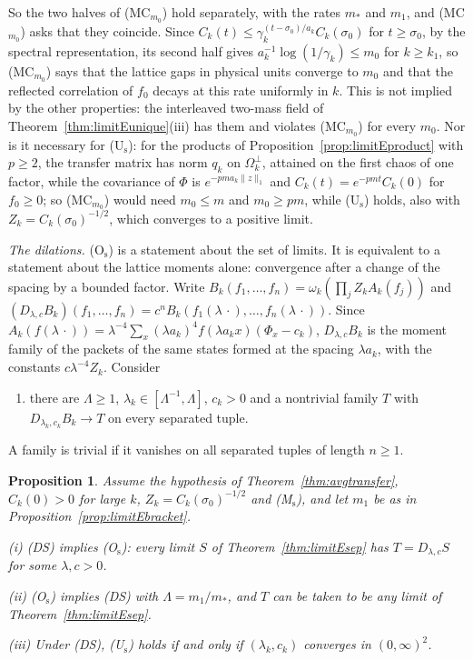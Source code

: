\documentclass[aps,prd,twocolumn,superscriptaddress,nofootinbib,longbibliography,floatfix,amsmath,amssymb,10pt]{revtex4-2}
\newtheorem{proposition}[theorem]{Proposition}
\theoremstyle{definition}
\theoremstyle{remark}
\begin{document}
So the two halves of (MC$_{m_0}$) hold separately, with the rates $m_*$
and $m_1$, and (MC$_{m_0}$) asks that they coincide. Since $C_k(t)\le
\gamma_k^{(t-\sigma_0)/a_k}C_k(\sigma_0)$ for $t\ge\sigma_0$, by the spectral
representation, its second half gives $a_k^{-1}\log(1/\gamma_k)\le m_0$ for
$k\ge k_1$, so (MC$_{m_0}$) says that the lattice gaps in physical units
converge to $m_0$ and that the reflected correlation of $f_0$ decays at
this rate uniformly in $k$. This is not implied by the other
properties: the interleaved two-mass field of
Theorem~\ref{thm:limitEunique}(iii) has them and violates (MC$_{m_0}$) for
every $m_0$. Nor is it necessary for (U$_{\mathrm s}$): for the products of
Proposition~\ref{prop:limitEproduct} with $p\ge2$, the transfer matrix has
norm $q_k$ on $\Omega_k^\perp$, attained on the first chaos of one factor,
while the covariance of $\Phi$ is $e^{-pma_k\|z\|_1}$ and $C_k(t)=e^{-pmt}
C_k(0)$ for $f_0\ge0$; so (MC$_{m_0}$) would need $m_0\le m$ and $m_0\ge
pm$, while (U$_{\mathrm s}$) holds, also with $Z_k=C_k(\sigma_0)^{-1/2}$,
which converges to a positive limit.

\emph{The dilations.} (O$_{\mathrm s}$) is a statement about the set of
limits. It is equivalent to a statement about the lattice moments alone:
convergence after a change of the spacing by a bounded factor. Write
$B_k(f_1,\dots,f_n)=\omega_k(\prod_jZ_kA_k(f_j))$ and $(D_{\lambda,c}
B_k)(f_1,\dots,f_n)=c^nB_k(f_1(\lambda\,\cdot),\dots,f_n(\lambda\,\cdot))$.
Since $A_k(f(\lambda\,\cdot))=\lambda^{-4}\sum_x(\lambda a_k)^4f(\lambda
a_kx)(\Phi_x-c_k)$, $D_{\lambda,c}B_k$ is the moment family of the packets of
the same states formed at the spacing $\lambda a_k$, with the constants
$c\lambda^{-4}Z_k$. Consider
\begin{enumerate}[label=\textup{(DS)},leftmargin=*]
\item there are $\Lambda\ge1$, $\lambda_k\in[\Lambda^{-1},\Lambda]$,
$c_k>0$ and a nontrivial family $T$ with $D_{\lambda_k,c_k}B_k\to T$ on
every separated tuple.
\end{enumerate}
A family is trivial if it vanishes on all separated tuples of length
$n\ge1$.

\begin{proposition}\label{prop:limitEdilate}
Assume the hypothesis of Theorem~\textup{\ref{thm:avgtransfer}},
$C_k(0)>0$ for large $k$, $Z_k=C_k(\sigma_0)^{-1/2}$ and \textup{(M$_{\mathrm
s}$)}, and let $m_1$ be as in Proposition~\textup{\ref{prop:limitEbracket}}.

\textup{(i)} \textup{(DS)} implies \textup{(O$_{\mathrm s}$)}: every limit
$S$ of Theorem~\textup{\ref{thm:limitEsep}} has $T=D_{\lambda,c}S$ for some
$\lambda,c>0$.

\textup{(ii)} \textup{(O$_{\mathrm s}$)} implies \textup{(DS)} with
$\Lambda=m_1/m_*$, and $T$ can be taken to be any limit of
Theorem~\textup{\ref{thm:limitEsep}}.

\textup{(iii)} Under \textup{(DS)}, \textup{(U$_{\mathrm s}$)} holds if and
only if $(\lambda_k,c_k)$ converges in $(0,\infty)^2$.
\end{proposition}
\end{document}
